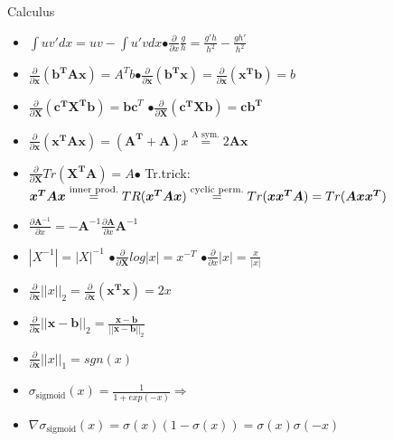 Calculus
\begin{itemize}
    \item $\int uv'dx = uv - \int u'vdx$\hspace{0.3cm}$ \bullet\frac{\partial}{\partial x}\frac{g}{h} = \frac{g'h}{h^2} - \frac{gh'}{h^2}$
    \item $\frac{\partial}{\partial\boldsymbol{ x}}(\boldsymbol{b^TAx})=A^Tb$\hspace{0.3cm}$\bullet \frac{\partial}{\partial\boldsymbol{ x}}(\boldsymbol{b^Tx}) = \frac{\partial}{\partial\boldsymbol{ x}}(\boldsymbol{x^Tb}) = b$
    \item $\frac{\partial}{\partial\boldsymbol{ X}}(\boldsymbol{c^TX^Tb}) = \boldsymbol{bc}^T$ \hspace{0.3cm} $\bullet\frac{\partial}{\partial\boldsymbol{ X}}(\boldsymbol{c^TXb}) = \boldsymbol{cb^T}$
    \item $\frac{\partial}{\partial\boldsymbol{ x}}(\boldsymbol{x^TAx})=(\boldsymbol{A^T +A})x \overset{\text{A sym.}}{=} 2\boldsymbol{Ax}$
    \item $\frac{\partial}{\partial\boldsymbol{ X}}Tr(\boldsymbol{X^TA}) = A$\hspace{0.3cm}$\bullet$ Tr.trick: $\boldsymbol{x^TAx} \overset{\text{inner prod.}}{=}\\
    TR(\boldsymbol{x^TAx}) \overset{\text{cyclic perm.}}{=} Tr(\boldsymbol{xx^TA}) = Tr(\boldsymbol{Axx^T})$
    \item $\frac{\partial \boldsymbol{A}^{-1 }}{\partial x} = -\boldsymbol{A}^{-1}\frac{\partial \boldsymbol{A}}{\partial x}\boldsymbol{A}^{-1}$
    \item $|X^{-1}|=|X|^{-1}$ \hspace{0.02cm} $\bullet \frac{\partial}{\partial\boldsymbol{ X}}log|x|=x^{-T}$ \hspace{0.02cm} $\bullet \frac{\partial}{\partial x}|x| = \frac{x}{|x|}$
    \item $\frac{\partial}{\partial\boldsymbol{ x}}||x||_2 = \frac{\partial}{\partial\boldsymbol{ x}}(\boldsymbol{x^Tx}) = 2x$
    \item $\frac{\partial}{\partial\boldsymbol{ x}}||\boldsymbol{x-b}||_2 = \frac{\boldsymbol{x-b}}{||\boldsymbol{x-b}||_2}$
    \item $\frac{\partial}{\partial\boldsymbol{ x}} ||x||_1 = sgn(x)$
    \item $\sigma_{\text{sigmoid}}(x) = \frac{1}{1 + exp(-x)} \Rightarrow $
    \item $\nabla \sigma_{\text{sigmoid}}(x) = \sigma(x)(1-\sigma(x)) = \sigma(x)\sigma(-x)$

\end{itemize}
